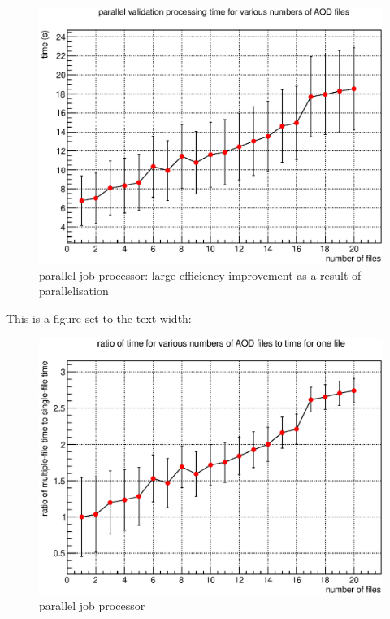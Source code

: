 \begin{figure}[H]
\begin{center}
\includegraphics[width=\measureUSpecification]{images/2014-04-10_1.eps}
\end{center}
\caption{parallel job processor: large efficiency improvement as a result of parallelisation}
\end{figure}

This is a figure set to the text width:

\begin{figure}[H]
\begin{center}
\includegraphics[width=\textwidth]{images/2014-04-10_2.eps}
\end{center}
\caption{parallel job processor}
\label{figure:PJP_1}
\end{figure}

